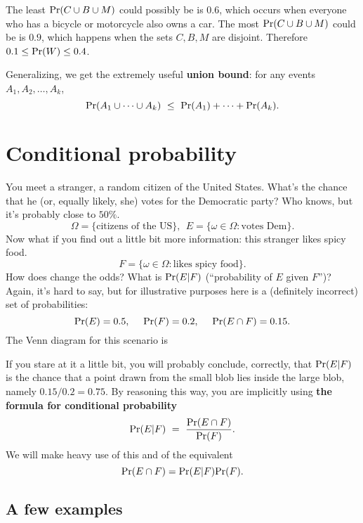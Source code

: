 The least $\mbox{\rm Pr}(C \cup B \cup M)$ could possibly be is $0.6$, which occurs when everyone who has a bicycle or motorcycle also owns a car. The most $\mbox{\rm Pr}(C \cup B \cup M)$ could be is $0.9$, which happens when the sets $C,B,M$ are disjoint. Therefore $0.1 \leq \mbox{\rm Pr}(W) \leq 0.4$.
 
Generalizing, we get the extremely useful {\bf union bound}: for any events $A_1, A_2, \ldots, A_k$,
$$ \pr(A_1 \cup \cdots \cup A_k) \ \leq \ \pr(A_1) + \cdots + \pr(A_k) .$$


\section{Conditional probability}

You meet a stranger, a random citizen of the United States. What's the chance that he (or, equally likely, she) votes for the Democratic party? Who knows, but it's probably close to $50\%$.
$$ \Omega = \{\mbox{citizens of the US}\}, \ \ E = \{\omega \in \Omega: \mbox{votes Dem}\}.$$
Now what if you find out a little bit more information: this stranger likes spicy food.
$$ F = \{\omega \in \Omega: \mbox{likes spicy food}\}.$$
How does change the odds? What is $\mbox{\rm Pr}(E|F)$ (``probability of $E$ given $F$'')? Again, it's hard to say, but for illustrative purposes here is a (definitely incorrect) set of probabilities:
$$ \mbox{\rm Pr}(E) = 0.5, \ \ \ \ \mbox{\rm Pr}(F) = 0.2, \ \ \ \ \mbox{\rm Pr}(E \cap F) = 0.15.$$
The Venn diagram for this scenario is

\begin{center}
\end{center}

\noindent
If you stare at it a little bit, you will probably conclude, correctly, that $\mbox{\rm Pr}(E|F)$ is the chance that a point drawn from the small blob lies inside the large blob, namely $0.15/0.2 = 0.75$. By reasoning this way, you are implicitly using {\bf the formula for conditional probability}
$$ \mbox{\rm Pr}(E|F) \ = \ \frac{\mbox{\rm Pr}(E \cap F)}{\mbox{\rm Pr}(F)} .$$
We will make heavy use of this and of the equivalent
$$ \mbox{\rm Pr}(E \cap F) = \mbox{\rm Pr}(E|F) \mbox{\rm Pr}(F).$$

\subsection{A few examples}


